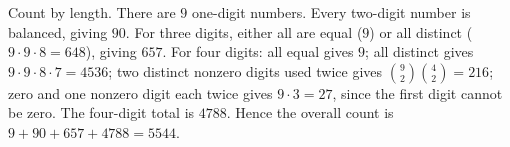 Count by length. There are $9$ one-digit numbers. Every two-digit number is balanced, giving $90$. For three digits, either all are equal ($9$) or all distinct ($9\cdot9\cdot8=648$), giving $657$. For four digits: all equal gives $9$; all distinct gives $9\cdot9\cdot8\cdot7=4536$; two distinct nonzero digits used twice gives $\binom92\binom42=216$; zero and one nonzero digit each twice gives $9\cdot3=27$, since the first digit cannot be zero. The four-digit total is $4788$. Hence the overall count is $9+90+657+4788=\boxed{5544}$.
